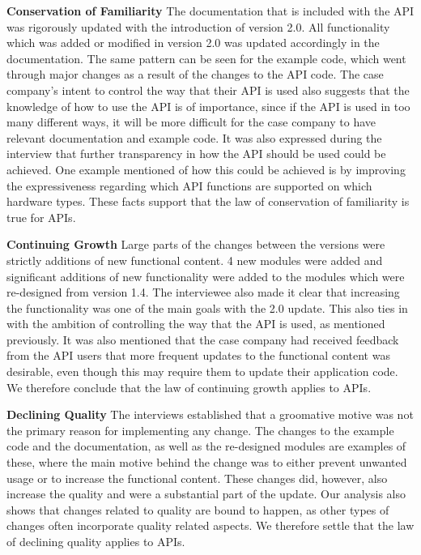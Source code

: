 \documentclass{sig-alternate}
\begin{document}
\smallskip \noindent
\textbf{Conservation of Familiarity  } 
The documentation that is included with the API was rigorously updated with the introduction of version 2.0. All functionality which was added or modified in version 2.0 was updated accordingly in the documentation. The same pattern can be seen for the example code, which went through major changes as a result of the changes to the API code. The case company's intent to control the way that their API is used also suggests that the knowledge of how to use the API is of importance, since if the API is used in too many different ways, it will be more difficult for the case company to have relevant documentation and example code. It was also expressed during the interview that further transparency in how the API should be used could be achieved. One example mentioned of how this could be achieved is by improving the expressiveness regarding which API functions are supported on which hardware types. These facts support that the law of conservation of familiarity is true for APIs. 

\smallskip \noindent
\textbf{Continuing Growth  } 
Large parts of the changes between the versions were strictly additions of new functional content. 4 new modules were added and significant additions of new functionality were added to the modules which were re-designed from version 1.4. The interviewee also made it clear that increasing the functionality was one of the main goals with the 2.0 update. This also ties in with the ambition of controlling the way that the API is used, as mentioned previously. It was also mentioned that the case company had received feedback from the API users that more frequent updates to the functional content was desirable, even though this may require them to update their application code. We therefore conclude that the law of continuing growth applies to APIs. 

\smallskip \noindent
\textbf{Declining Quality  } 
The interviews established that a groomative motive was not the primary reason for implementing any change. The changes to the example code and the documentation, as well as the re-designed modules are examples of these, where the main motive behind the change was to either prevent unwanted usage or to increase the functional content. These changes did, however, also increase the quality and were a substantial part of the update. Our analysis also shows that changes related to quality are bound to happen, as other types of changes often incorporate quality related aspects. We therefore settle that the law of declining quality applies to APIs. 
\end{document}
